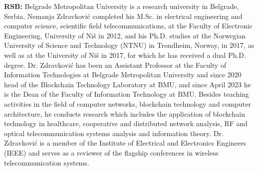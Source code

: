 \item \textbf{RSB:} Belgrade Metropolitan University is a research university in Belgrade, Serbia. Nemanja Zdravković completed his M.Sc. in electrical engineering and computer science, scientific field telecommunications, at the Faculty of Electronic Engineering, University of Niš in 2012, and his Ph.D. studies at the Norwegian University of Science and Technology (NTNU) in Trondheim, Norway, in 2017, as well as at the University of Niš in 2017, for which he has received a dual Ph.D. degree. Dr. Zdravković has been an Assistant Professor at the Faculty of Information Technologies at Belgrade Metropolitan University and since 2020 head of the Blockchain Technology Laboratory at BMU, and since April 2023 he is the Dean of the Faculty of Information Technology at BMU. Besides teaching activities in the field of computer networks, blockchain technology and computer architecture, he conducts research which includes the application of blockchain technology in healthcare, cooperative and distributed network analysis, RF and optical telecommunication systems analysis and information theory. Dr. Zdravković is a member of the Institute of Electrical and Electronics Engineers (IEEE) and serves as a reviewer of the flagship conferences in wireless telecommunication systems.

